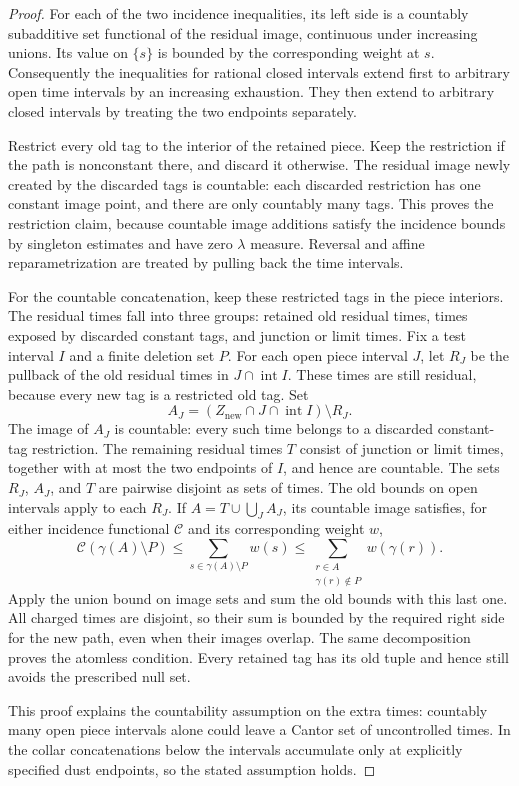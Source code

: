 \begin{proof}
For each of the two incidence inequalities, its left side is a
countably subadditive set functional of the residual image, continuous
under increasing unions.  Its value on $\{s\}$ is bounded by the
corresponding weight at $s$.  Consequently the inequalities for rational
closed intervals extend first to arbitrary open time intervals by an
increasing exhaustion.  They then extend to arbitrary closed intervals
by treating the two endpoints separately.

Restrict every old tag to the interior of the retained piece.  Keep
the restriction if the path is nonconstant there, and discard it
otherwise.  The residual image newly created by the discarded tags is
countable: each discarded restriction has one constant image point,
and there are only countably many tags.  This proves the restriction
claim, because countable image additions satisfy the incidence bounds
by singleton estimates and have zero $\lambda$ measure.  Reversal and
affine reparametrization are treated by pulling back the time intervals.

For the countable concatenation, keep these restricted tags in the
piece interiors.  The residual times fall into three groups: retained
old residual times, times exposed by discarded constant tags, and
junction or limit times.  Fix a test interval $I$ and a finite deletion
set $P$.  For each open piece interval $J$, let $R_J$ be the pullback of
the old residual times in $J\cap\operatorname{int}I$.  These times
are still residual, because every new tag is a restricted old tag.
Set
\[
 A_J=(Z_{\mathrm{new}}\cap J\cap\operatorname{int}I)\setminus R_J.
\]
The image of $A_J$ is countable: every such time belongs to a discarded
constant-tag restriction.  The remaining residual times $T$ consist
of junction or limit times, together with at most the two endpoints
of $I$, and hence are countable.  The sets $R_J$, $A_J$, and $T$ are
pairwise disjoint as sets of times.  The old bounds on open intervals
apply to each $R_J$.  If $A=T\cup\bigcup_J A_J$, its countable image
satisfies, for either incidence functional $\mathcal C$ and its
corresponding weight $w$,
\[
 \mathcal C(\gamma(A)\setminus P)
 \le\sum_{s\in\gamma(A)\setminus P}w(s)
 \le\sum_{\substack{r\in A\\\gamma(r)\notin P}}w(\gamma(r)).
\]
Apply the union bound on image sets and sum the old bounds with this
last one.  All charged times are disjoint, so their sum is bounded by
the required right side for the new path, even when their images
overlap.  The same decomposition proves the atomless condition.
Every retained tag has its old tuple and hence still avoids the
prescribed null set.

This proof explains the countability assumption on the extra times:
countably many open piece intervals alone could leave a Cantor set of
uncontrolled times.  In the collar concatenations below the intervals
accumulate only at explicitly specified dust endpoints, so the stated
assumption holds.
\end{proof}

